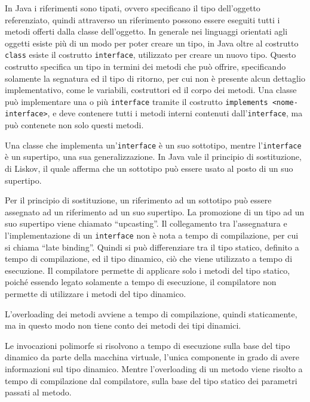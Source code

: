 \documentclass{article}
\numberwithin{equation}{subsection}
\begin{document}
In Java i riferimenti sono tipati, ovvero specificano il tipo dell'oggetto referenziato, quindi attraverso un riferimento possono essere eseguiti tutti i metodi offerti dalla 
classe dell'oggetto. In generale nei linguaggi orientati agli oggetti esiste più di un modo per poter creare un tipo, in Java oltre al costrutto \verb|class| esiste il 
costrutto \verb|interface|, utilizzato per creare un nuovo tipo. 
Questo costrutto specifica un tipo in termini dei metodi che può offrire, specificando solamente la segnatura ed il tipo di ritorno, per cui non è presente alcun dettaglio 
implementativo, come le variabili, costruttori ed il corpo dei metodi. Una classe può implementare una o più \verb|interface| tramite il costrutto \verb|implements <nome-interface>|, 
e deve contenere tutti i metodi interni contenuti dall'\verb|interface|, ma può contenete non solo questi metodi. 

Una classe che implementa un'\verb|interface| è un suo sottotipo, mentre l'\verb|interface| è un supertipo, una sua generalizzazione. 
In Java vale il principio di sostituzione, di Liskov, il quale afferma che un sottotipo può essere usato al posto di un suo supertipo. 


Per il principio di sostituzione, un riferimento ad un sottotipo può essere assegnato ad un riferimento ad un suo supertipo. La promozione di un tipo ad un suo supertipo viene 
chiamato ``upcasting''. 
Il collegamento tra l'assegnatura e l'implementazione di un \verb|interface| non è nota a tempo di compilazione, per cui si chiama ``late binding''. 
Quindi si può differenziare tra il tipo statico, definito a tempo di compilazione, ed il tipo dinamico, ciò che viene utilizzato a tempo di esecuzione. Il compilatore 
permette di applicare solo i metodi del tipo statico, poiché essendo legato solamente a tempo di esecuzione, il compilatore non permette di utilizzare i metodi del tipo 
dinamico. 

L'overloading dei metodi avviene a tempo di compilazione, quindi staticamente, ma in questo modo non tiene conto dei metodi dei tipi dinamici. 


Le invocazioni polimorfe si risolvono a tempo di esecuzione sulla base del tipo dinamico da parte della macchina virtuale, l'unica componente in grado di avere informazioni 
sul tipo dinamico. Mentre l'overloading di un metodo viene risolto a tempo di compilazione dal compilatore, sulla base del tipo statico dei parametri passati al metodo. 
\end{document}
